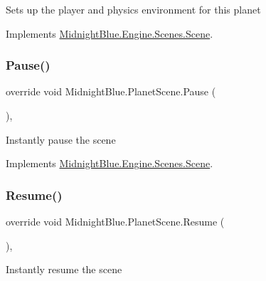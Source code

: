 Sets up the player and physics environment for this planet 



Implements \hyperlink{class_midnight_blue_1_1_engine_1_1_scenes_1_1_scene_aa919101862c14384b955d91a4d3362ab}{Midnight\+Blue.\+Engine.\+Scenes.\+Scene}.

\hypertarget{class_midnight_blue_1_1_planet_scene_abc077e1cd5f40879ca3af4224f0ff455}{}\label{class_midnight_blue_1_1_planet_scene_abc077e1cd5f40879ca3af4224f0ff455} 
\subsubsection{\texorpdfstring{Pause()}{Pause()}}
{\footnotesize\ttfamily override void Midnight\+Blue.\+Planet\+Scene.\+Pause (\begin{DoxyParamCaption}{ }\end{DoxyParamCaption})\hspace{0.3cm}{\ttfamily [inline]}, {\ttfamily [virtual]}}



Instantly pause the scene 



Implements \hyperlink{class_midnight_blue_1_1_engine_1_1_scenes_1_1_scene_aeb3c4d9bea0177d21fbffcdabab660de}{Midnight\+Blue.\+Engine.\+Scenes.\+Scene}.

\hypertarget{class_midnight_blue_1_1_planet_scene_aa14750d3675b59462796e821b3921397}{}\label{class_midnight_blue_1_1_planet_scene_aa14750d3675b59462796e821b3921397} 
\subsubsection{\texorpdfstring{Resume()}{Resume()}}
{\footnotesize\ttfamily override void Midnight\+Blue.\+Planet\+Scene.\+Resume (\begin{DoxyParamCaption}{ }\end{DoxyParamCaption})\hspace{0.3cm}{\ttfamily [inline]}, {\ttfamily [virtual]}}



Instantly resume the scene 



